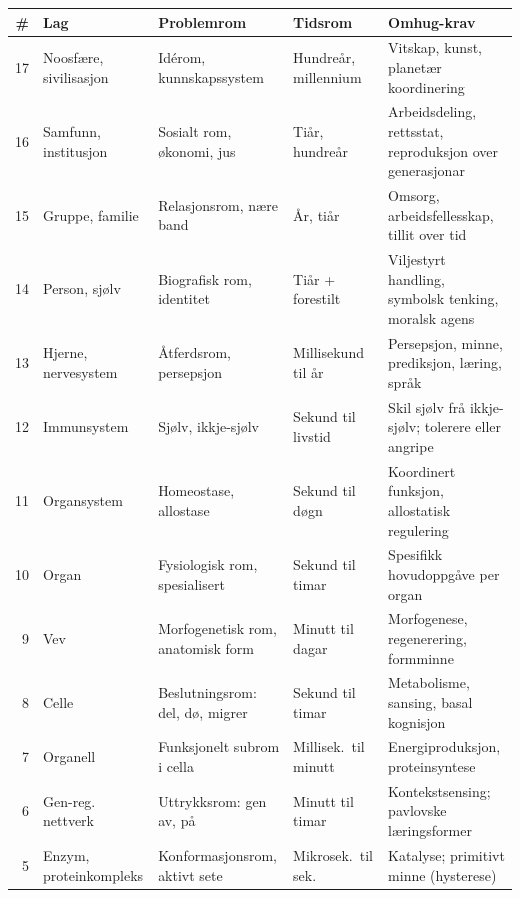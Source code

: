 \thispagestyle{empty}
\vspace*{-18mm}
\noindent
\begin{widebody}
\footnotesize
\setlength{\tabcolsep}{3pt}
\renewcommand{\arraystretch}{1.45}
\begin{tabular*}{\linewidth}{@{\extracolsep{\fill}}rp{18mm}p{22mm}p{16mm}p{26mm}@{}}
\toprule
\textbf{\#} & \textbf{Lag} & \textbf{Problemrom} & \textbf{Tidsrom} & \textbf{Omhug-krav} \\
\midrule
\rowcolor{violet!10}17 & Noosfære, sivilisasjon & Idérom, kunnskapssystem & Hundreår, millennium & Vitskap, kunst, planetær koordinering \\
\rowcolor{violet!10}16 & Samfunn, institusjon & Sosialt rom, økonomi, jus & Tiår, hundreår & Arbeidsdeling, rettsstat, reproduksjon over generasjonar \\
\rowcolor{violet!10}15 & Gruppe, familie & Relasjonsrom, nære band & År, tiår & Omsorg, arbeidsfellesskap, tillit over tid \\
\rowcolor{yellow!18}14 & Person, sjølv & Biografisk rom, identitet & Tiår + forestilt & Viljestyrt handling, symbolsk tenking, moralsk agens \\
\rowcolor{yellow!18}13 & Hjerne, nervesystem & Åtferdsrom, persepsjon & Millisekund til år & Persepsjon, minne, prediksjon, læring, språk \\
\rowcolor{red!12}12 & Immunsystem & Sjølv, ikkje-sjølv & Sekund til livstid & Skil sjølv frå ikkje-sjølv; tolerere eller angripe \\
\rowcolor{green!8}11 & Organsystem & Homeostase, allostase & Sekund til døgn & Koordinert funksjon, allostatisk regulering \\
\rowcolor{green!8}10 & Organ & Fysiologisk rom, spesialisert & Sekund til timar & Spesifikk hovudoppgåve per organ \\
\rowcolor{green!8}9 & Vev & Morfogenetisk rom, anatomisk form & Minutt til dagar & Morfogenese, regenerering, formminne \\
\rowcolor{green!14}8 & Celle & Beslutningsrom: del, dø, migrer & Sekund til timar & Metabolisme, sansing, basal kognisjon \\
\rowcolor{green!14}7 & Organell & Funksjonelt subrom i cella & Millisek.\ til minutt & Energiproduksjon, proteinsyntese \\
\rowcolor{green!14}6 & Gen-reg. nettverk & Uttrykksrom: gen av, på & Minutt til timar & Kontekstsensing; pavlovske læringsformer \\
\rowcolor{green!14}5 & Enzym, proteinkompleks & Konformasjonsrom, aktivt sete & Mikrosek.\ til sek. & Katalyse; primitivt minne (hysterese) \\

\end{tabular*}
\end{widebody}
